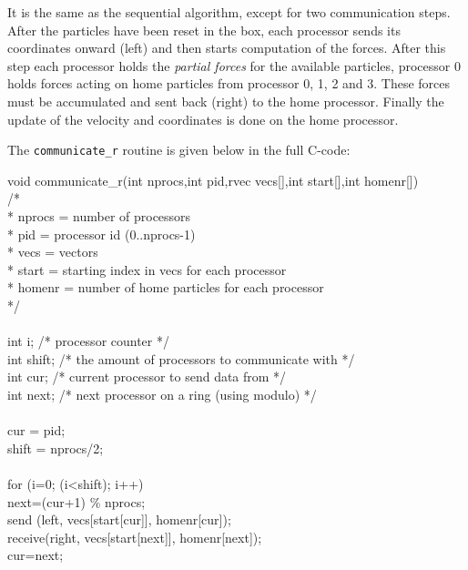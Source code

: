 It is the same as the sequential algorithm, except for two
communication steps. After the particles have been reset in the box,
each processor sends its coordinates onward (left) and then starts computation
of the forces.  After this step each processor holds the {\em partial
forces} for the available particles, {\eg} processor 0 holds forces
acting on home particles from processor 0, 1, 2 and 3. These forces
must be accumulated and sent back (right) to the home
processor. Finally the update of the velocity and coordinates is done
on the home processor.

The {\tt communicate\_r} routine is given below in the full C-code:\\
\begin{footnotesize}
\begin{tt}
void communicate\_r(int nprocs,int pid,rvec vecs[],int start[],int homenr[])\\
/* \\
 * nprocs = number of processors\\
 * pid    = processor id (0..nprocs-1)\\
 * vecs   = vectors\\
 * start  = starting index in vecs for each processor\\
 * homenr = number of home particles for each processor\\
 */\\
{\\
  int i;        /* processor counter */\\
  int shift;    /* the amount of processors to communicate with */\\
  int cur;      /* current processor to send data from */\\
  int next;     /* next processor on a ring (using modulo) */\\
\\
  cur   = pid;\\
  shift = nprocs/2;\\
\\
  for (i=0; (i<shift); i++) {\\
    next=(cur+1) \% nprocs;     \\ 
    send   (left,  vecs[start[cur]],  homenr[cur]);\\
    receive(right, vecs[start[next]], homenr[next]);\\
    cur=next;\\
  }\\
}\\
\end{tt}

\end{footnotesize}

